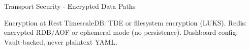 \begin{frame}{Transport Security - Encrypted Data Paths}
  \vspace{0.05cm}

  \begin{exampleblock}{Encryption at Rest}
    \scriptsize
    TimescaleDB: TDE or filesystem encryption (LUKS). Redis: encrypted RDB/AOF or
    ephemeral mode (no persistence). Dashboard config: Vault-backed, never plaintext YAML.
  \end{exampleblock}
\end{frame}
